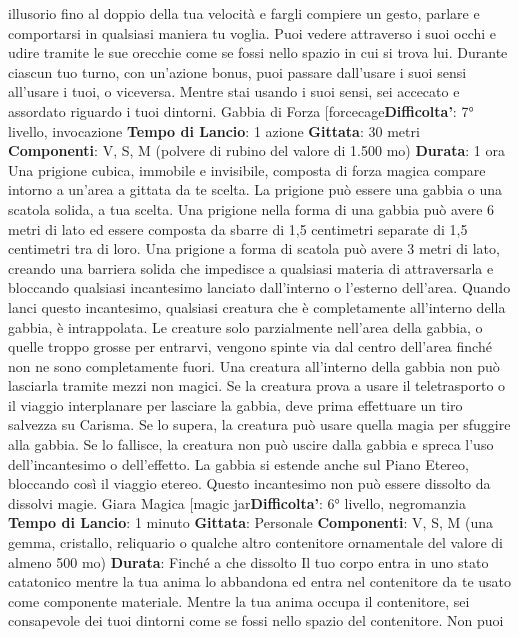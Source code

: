 \begin{multicols}{2}
illusorio fino al doppio della tua velocità e fargli
compiere un gesto, parlare e comportarsi in qualsiasi
maniera tu voglia.
Puoi vedere attraverso i suoi occhi e udire tramite le
sue orecchie come se fossi nello spazio in cui si trova
lui. Durante ciascun tuo turno, con un’azione bonus,
puoi passare dall’usare i suoi sensi all’usare i tuoi, o
viceversa. Mentre stai usando i suoi sensi, sei accecato
e assordato riguardo i tuoi dintorni.
Gabbia di Forza
[forcecage\textbf{Difficolta'}:
7° livello, invocazione
\textbf{Tempo di Lancio}: 1 azione
\textbf{Gittata}: 30 metri
\textbf{Componenti}: V, S, M (polvere di rubino del valore di
1.500 mo)
\textbf{Durata}: 1 ora
Una prigione cubica, immobile e invisibile, composta di
forza magica compare intorno a un’area a gittata da te
scelta. La prigione può essere una gabbia o una scatola
solida, a tua scelta.
Una prigione nella forma di una gabbia può avere 6
metri di lato ed essere composta da sbarre di 1,5
centimetri separate di 1,5 centimetri tra di loro.
Una prigione a forma di scatola può avere 3 metri di
lato, creando una barriera solida che impedisce a
qualsiasi materia di attraversarla e bloccando qualsiasi
incantesimo lanciato dall’interno o l’esterno dell’area.
Quando lanci questo incantesimo, qualsiasi creatura
che è completamente all’interno della gabbia, è
intrappolata. Le creature solo parzialmente nell’area
della gabbia, o quelle troppo grosse per entrarvi,
vengono spinte via dal centro dell’area finché non ne
sono completamente fuori.
Una creatura all’interno della gabbia non può lasciarla
tramite mezzi non magici. Se la creatura prova a usare
il teletrasporto o il viaggio interplanare per lasciare la
gabbia, deve prima effettuare un tiro salvezza su
Carisma. Se lo supera, la creatura può usare quella
magia per sfuggire alla gabbia. Se lo fallisce, la
creatura non può uscire dalla gabbia e spreca l’uso
dell’incantesimo o dell’effetto. La gabbia si estende
anche sul Piano Etereo, bloccando così il viaggio
etereo.
Questo incantesimo non può essere dissolto da dissolvi
magie.
Giara Magica
[magic jar\textbf{Difficolta'}:
6° livello, negromanzia
\textbf{Tempo di Lancio}: 1 minuto
\textbf{Gittata}: Personale
\textbf{Componenti}: V, S, M (una gemma, cristallo, reliquario
o qualche altro contenitore ornamentale del valore di
almeno 500 mo)
\textbf{Durata}: Finché a che dissolto
Il tuo corpo entra in uno stato catatonico mentre la tua
anima lo abbandona ed entra nel contenitore da te
usato come componente materiale. Mentre la tua anima
occupa il contenitore, sei consapevole dei tuoi dintorni
come se fossi nello spazio del contenitore. Non puoi

\end{multicols}
